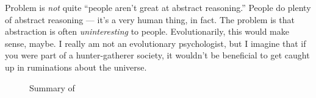 \documentclass{fkpset}
\begin{document}
\begin{solution}[Response.]
  Problem is \emph{not} quite ``people aren't great at abstract
  reasoning.'' People do plenty of abstract reasoning --- it's a very
  human thing, in fact. The problem is that abstraction is often
  \emph{uninteresting} to people. Evolutionarily, this would make
  sense, maybe. I really am not an evolutionary psychologist, but I
  imagine that if you were part of a hunter-gatherer society, it
  wouldn't be beneficial to get caught up in ruminations about the
  universe.
  \begin{figure}[h]
    \centering
    \caption{Summary of }
  \end{figure}


\end{solution}
\end{document}
